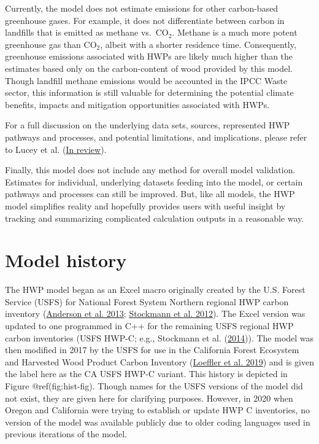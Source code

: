 \documentclass[
  openany]{book}
\begin{document}
Currently, the model does not estimate emissions for other carbon-based
greenhouse gases. For example, it does not differentiate between carbon
in landfills that is emitted as methane vs.~CO\(_2\). Methane is a much
more potent greenhouse gas than CO\(_2\), albeit with a shorter
residence time. Consequently, greenhouse emissions associated with HWPs
are likely much higher than the estimates based only on the
carbon-content of wood provided by this model. Though landfill methane
emissions would be accounted in the IPCC Waste sector, this information
is still valuable for determining the potential climate benefits,
impacts and mitigation opportunities associated with HWPs.

For a full discussion on the underlying data sets, sources, represented
HWP pathways and processes, and potential limitations, and implications,
please refer to Lucey et al. (\protect\hyperlink{ref-lucey202X}{In
review}).

Finally, this model does not include any method for overall model
validation. Estimates for individual, underlying datasets feeding into
the model, or certain pathways and processes can still be improved. But,
like all models, the HWP model simplifies reality and hopefully provides
users with useful insight by tracking and summarizing complicated
calculation outputs in a reasonable way.

\hypertarget{int-hist}{%
\section{Model history}\label{int-hist}}

The HWP model began as an Excel macro originally created by the U.S.
Forest Service (USFS) for National Forest System Northern regional HWP
carbon inventory (\protect\hyperlink{ref-anderson2013}{Anderson et al.
2013}; \protect\hyperlink{ref-stockmann2012}{Stockmann et al. 2012}).
The Excel version was updated to one programmed in C++ for the remaining
USFS regional HWP carbon inventories (USFS HWP-C; e.g., Stockmann et al.
(\protect\hyperlink{ref-stockmann2014}{2014})). The model was then
modified in 2017 by the USFS for use in the California Forest Ecosystem
and Harvested Wood Product Carbon Inventory
(\protect\hyperlink{ref-loeffler2019}{Loeffler et al. 2019}) and is
given the label here as the CA USFS HWP-C variant. This history is
depicted in Figure @ref(fig:hist-fig). Though names for the USFS
versions of the model did not exist, they are given here for clarifying
purposes. However, in 2020 when Oregon and California were trying to
establish or update HWP C inventories, no version of the model was
available publicly due to older coding languages used in previous
iterations of the model.
\end{document}

